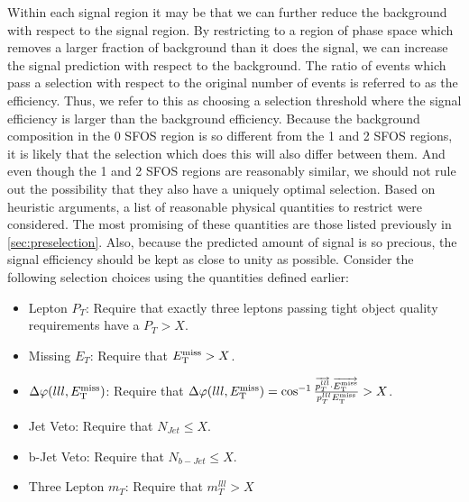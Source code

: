 Within each signal region it may be that we can further reduce the 
background with respect to the signal region. 
By restricting to a region of phase space which removes a larger
fraction of background than it does the signal, we can 
increase the signal prediction with respect to the background.
The ratio of events which pass a selection with respect
to the original number of events is referred to as the 
efficiency.
Thus, we refer to this as choosing a selection threshold where 
the signal efficiency is larger than the background efficiency.
Because the background composition in the 0 SFOS region
is so different from the 1 and 2 SFOS regions, it is likely that
the selection which does this will also differ between them. 
And even though the
1 and 2 SFOS regions are reasonably similar, we should not rule out
the possibility that they also have a uniquely optimal selection.
Based on heuristic arguments, a list of reasonable physical
quantities to restrict were considered. The most promising of these quantities
are those listed previously in \sec\ref{sec:preselection}. 
Also, because the predicted amount of signal is so precious,
the signal efficiency should be kept as close to unity as possible.
Consider the following selection choices using the quantities defined
earlier:
\begin{itemize}
\item Lepton $P_{T}$:  Require that exactly three leptons passing tight object quality requirements have a $P_{T} > X$.
\item Missing $E_{T}$:  Require that $E_{\mathrm{T}}^{\mathrm{miss}} > X$.
\item $\Delta\varphi(lll,E_{\mathrm{T}}^{\mathrm{miss}})$:  Require that $\Delta\varphi(lll,E_{\mathrm{T}}^{\mathrm{miss}}) = \cos^{-1}\frac{ \overrightarrow{p_{T}^{lll}}\cdot\overrightarrow{E_{\mathrm{T}}^{\mathrm{miss}}} }{ p_{T}^{lll}E_{\mathrm{T}}^{\mathrm{miss}} } > X$.
\item Jet Veto: Require that $N_{Jet} \leq X$.
\item b-Jet Veto: Require that $N_{b-Jet} \leq X$.
\item Three Lepton $m_{T}$: Require that $m_{T}^{lll} > X$
\end{itemize}

